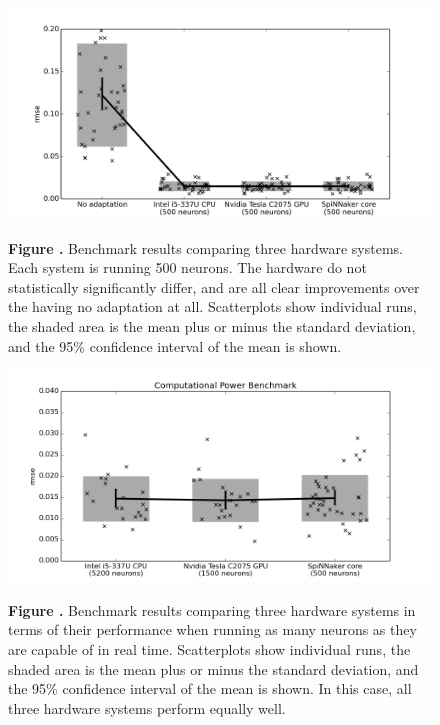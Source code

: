 \documentclass{frontiersSCNS} %
\begin{document}
\begin{figure}[h!]
\begin{center}
\includegraphics[width=18cm]{figures/plot_basic}
\end{center}
 \textbf{\label{fig:analysis_basic} Figure .}{ Benchmark results comparing three hardware systems.
     Each system is running 500 neurons.  The hardware do not statistically
     significantly differ, and are all clear improvements over the having
     no adaptation at all.
     Scatterplots show individual runs, the 
     shaded area is the mean plus or minus the standard deviation, and the 95\% confidence interval of the mean is shown.}
\end{figure}

\begin{figure}[h!]
\begin{center}
\includegraphics[width=18cm]{figures/plot_compute}
\end{center}
 \textbf{\label{fig:analysis_compute} Figure .}{ Benchmark results comparing three hardware systems
     in terms of their performance when running as many neurons as they are capable of in real time.  Scatterplots show individual runs, the 
     shaded area is the mean plus or minus the standard deviation, and the 95\% confidence interval of the mean is shown.  In this case,
     all three hardware systems perform equally well.}
\end{figure}
\end{document}
